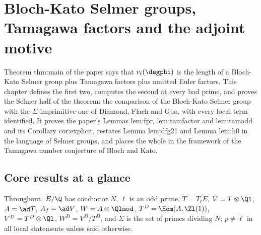 \chapter{Bloch-Kato Selmer groups, Tamagawa factors and the adjoint motive}\label{ch:blochkato}

Theorem thm:main of the paper says that $v_\ell(\degphi)$ is the length of a Bloch-Kato Selmer group plus Tamagawa factors plus omitted Euler factors. This chapter
defines the first two, computes the second at every bad prime, and proves the Selmer half of the theorem: the comparison of the Bloch-Kato Selmer group with the
$\Sigma$-imprimitive one of Diamond, Flach and Guo, with every local term identified. It proves the paper's Lemmas lem:fpr, lem:tamfactor and lem:tamadd and its
Corollary cor:explicit, restates Lemma lem:dfg21 and Lemma lem:h0 in the language of Selmer groups, and places the whole in the framework of the Tamagawa number
conjecture of Bloch and Kato.

\section*{Core results at a glance}

Throughout, $E/\Q$ has conductor $N$, $\ell$ is an odd prime, $T=T_\ell E$, $V=T\otimes\Ql$, $A=\ad T$, $A_f=\ad V$, $W=A\otimes\Qlmod$, $T^D=\Hom(A,\Zl(1))$, $V^D=T^D\otimes\Ql$, $W^D=V^D/T^D$, and $\Sigma$ is
the set of primes dividing $N$; $p\ne\ell$ in all local statements unless said otherwise.

